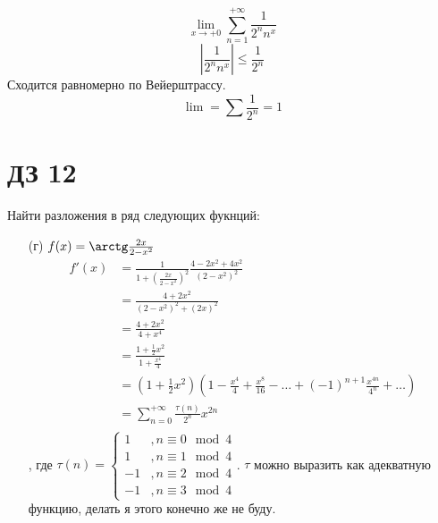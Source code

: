 \begin{exercise}[2808]
    \[\lim_{x \to +0} \sum_{n = 1}^{+\infty} \frac{1}{2^n n^x}\]
    \[\left|\frac{1}{2^n n^x}\right| \leq \frac{1}{2^n}\]
    Сходится равномерно по Вейерштрассу.
    \[\lim = \sum \frac{1}{2^n} = 1\]
\end{exercise}

\section*{ДЗ 12}


\begin{exercise}[2873]
    Найти разложения в ряд следующих фукнций:
    \begin{itemize}
        \item [(г)] \(f(x) = \arctg \frac{2x}{2 - x^2}\)
              \begin{align*}
                  f'(x) & = \frac{1}{1 + \left( \frac{2x}{2 - x^2} \right)^2} \frac{4 - 2x^2 + 4x^2}{(2 - x^2)^2}                                                  \\
                        & = \frac{4 + 2x^2}{(2 - x^2)^2 + (2x)^2}                                                                                                  \\
                        & = \frac{4 + 2x^2}{4 + x^4}                                                                                                               \\
                        & = \frac{1 + \frac{1}{2}x^2}{1 + \frac{x^4}{4}}                                                                                           \\
                        & = \left( 1 + \frac{1}{2}x^2 \right)\left( 1 - \frac{x^4}{4} + \frac{x^8}{16} - \dots + ( - 1)^{n + 1} \frac{x^{4n}}{4^n} + \dots \right) \\
                        & = \sum_{n = 0}^{+\infty} \frac{\tau(n)}{2^n} x^{2n}                                                                                      \\
              \end{align*}
              , где \(\tau(n) = \begin{cases}
                  1  & , n \equiv 0 \mod 4 \\
                  1  & , n \equiv 1 \mod 4 \\
                  -1 & , n \equiv 2 \mod 4 \\
                  -1 & , n \equiv 3 \mod 4
              \end{cases}\). \(\tau\) можно выразить как адекватную функцию, делать я этого конечно же не буду.


\end{itemize}
\end{exercise}
